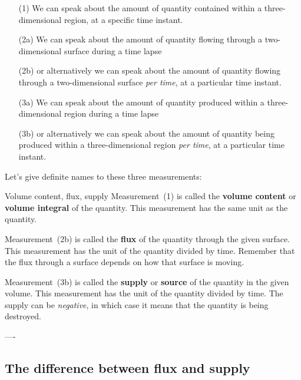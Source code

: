 \begin{enumerate}[noitemsep]
\item[(1)] We can speak about the amount of quantity contained within a three-dimensional region, at a specific time instant.

  \smallskip

\item[(2a)] We can speak about the amount of quantity flowing through a two-dimensional surface during a time lapse\textellipsis
\item[(2b)] \textellipsis or alternatively we can speak about the amount of quantity flowing through a two-dimensional surface \emph{per time}, at a particular time instant.

  \smallskip

\item[(3a)] We can speak about the amount of quantity produced within a three-dimensional region during a time lapse\textellipsis
\item[(3b)] \textellipsis or alternatively we can speak about the amount of quantity being produced within a three-dimensional region \emph{per time}, at a particular time instant.
\end{enumerate}
Let's give definite names to these three measurements:
\begin{definition}{{Volume content, flux, supply}}
  Measurement~(1) is called the \textbf{volume content} or \textbf{volume integral} of the quantity. This measurement has the same unit as the quantity.

  \smallskip

  Measurement~(2b) is called the \textbf{flux} of the quantity through the given surface. This measurement has the unit of the quantity divided by time. Remember that the flux through a surface depends on how that surface is moving.

  \smallskip

  Measurement~(3b) is called the \textbf{supply} or \textbf{source} of the quantity in the given volume. This measurement has the unit of the quantity divided by time. The supply can be \emph{negative}, in which case it means that the quantity is being destroyed.
\end{definition}


----



\subsection{The difference between flux and supply}
\label{sec:supply}


